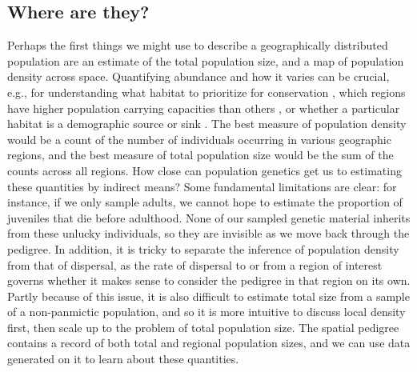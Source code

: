 \documentclass{ar-1col}
\newcommand{\todo}[1]{{\textbf{\color{red}{#1}}}}
\begin{document}
\subsection{Where are they?}
\todo{need to incorporate total size, or drop it as a main section and include it just as an afterthought,
bc we don't really have anything to say about the reflection of total size in the spatial pedigree.}
Perhaps the first things we might use
to describe a geographically distributed population
are an estimate of the total population size,
and a map of population density across space.
Quantifying abundance and how it varies
can be crucial, e.g., for understanding
what habitat to prioritize for conservation \citep{zipkin2018synthesizing}, 
which regions have higher population carrying capacities than others \citep{roughgarden1974}, 
or whether a particular habitat is a demographic source or sink 
\citep{pulliam1988sources}.
The best measure of population density
would be a count of the number of individuals occurring in various geographic regions, 
and the best measure of total population size would be the sum of the counts across all regions.
How close can population genetics get us to estimating these quantities by indirect means?
Some fundamental limitations are clear:
for instance, if we only sample adults,
we cannot hope to estimate the proportion of juveniles that die before adulthood.
None of our sampled genetic material inherits from these unlucky individuals,
so they are invisible as we move back through the pedigree.
In addition, it is tricky to separate the inference of population density 
from that of dispersal, 
as the rate of dispersal to or from a region of interest 
governs whether it makes sense to consider the pedigree in that region on its own.
Partly because of this issue, 
it is also difficult to estimate total size from a sample of a 
non-panmictic population, 
and so it is more intuitive to discuss local density first, 
then scale up to the problem of total population size.
The spatial pedigree contains a record of both total and regional population sizes, 
and we can use data generated on it to learn about these quantities.
\end{document}
